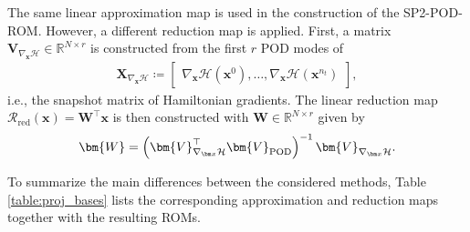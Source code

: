 \documentclass{article}
\newcommand{\bmV}{\bm{V}}
\newcommand{\bmW}{\bm{W}}
\newcommand{\bmX}{\bm{X}}
\newcommand{\R}{\mathbb{R}}
\newcommand{\curlyH}{\mathcal{H}}
\newcommand{\statex}{{\bm x}}
\newcommand{\snapsize}{n_t}
\newcommand{\FOMsize}{N}
\newcommand{\ROMsize}{r}
\newcommand{\VPOD}{\bmV_{\rm POD}}
\newcommand{\POD}{\textsf{POD}\xspace}
\newcommand{\ROM}{\textsf{ROM}\xspace}
\newcommand{\ROMs}{\textsf{ROM}s\xspace}
\newcommand{\SPQuad}{\textsf{SP2}\xspace}
\begin{document}
 The same linear approximation map is used in the construction of the \SPQuad-\POD-\ROM. However, a different reduction map is applied.
 First, a matrix $\bmV_{\nabla_{\statex}\curlyH}\in\R^{\FOMsize\times\ROMsize}$ is constructed from the first $r$ \POD modes of  
\begin{align*}
 	\bmX_{\nabla_{\statex}\curlyH}\coloneqq
 	\begin{bmatrix}
 		\nabla_{\statex}\curlyH(\statex^0),
 		\allowbreak
 		\ldots,
 		\allowbreak
 		\nabla_{\statex}\curlyH(\statex^{\snapsize})
 	\end{bmatrix},
 \end{align*}
i.e., the snapshot matrix of Hamiltonian gradients. 
 The linear reduction map $\mathcal{R}_{\text{red}}(\statex)=\bmW^{\top}\statex$ is then constructed with $\bmW\in\R^{\FOMsize\times\ROMsize}$ given by
 \begin{align}
 	\label{equ:const_SP_POD_redmap}
 	\bmW=\left(\bmV_{\nabla_{\statex}\curlyH}^{\top}\VPOD\right)^{-1}\bmV_{\nabla_{\statex}\curlyH}.
 \end{align} 

To summarize the main differences between the considered methods, Table \ref{table:proj_bases} lists the corresponding approximation and reduction maps together with the resulting \ROMs. 
\end{document}
